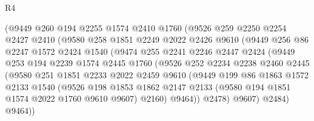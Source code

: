 \begin{lexlean}{R4}
\begin{coremodule}
                  (@9449
                    @260
                    @194
                    @2255
                    @1574
                    @2410
                    @1760
                    (@9526
                      @259
                      @2250
                      @2254
                      @2427
                      @2410
                      (@9580
                        @258
                        @1851
                        @2249
                        @2022
                        @2426
                        @9610
                        (@9449
                          @256
                          @86
                          @2247
                          @1572
                          @2424
                          @1540
                          (@9474
                            @255
                            @2241
                            @2246
                            @2447
                            @2424
                            (@9449
                              @253
                              @194
                              @2239
                              @1574
                              @2445
                              @1760
                              (@9526
                                @252
                                @2234
                                @2238
                                @2460
                                @2445
                                (@9580
                                  @251
                                  @1851
                                  @2233
                                  @2022
                                  @2459
                                  @9610
                                  (@9449
                                    @199
                                    @86
                                    @1863
                                    @1572
                                    @2133
                                    @1540
                                    (@9526
                                      @198
                                      @1853
                                      @1862
                                      @2147
                                      @2133
                                      (@9580 @194 @1851 @1574 @2022 @1760 @9610 @9607)
                                      @2160)
                                    @9464))
                                @2478)
                              @9607)
                            @2484)
                          @9464))

\end{coremodule}
\end{lexlean}
